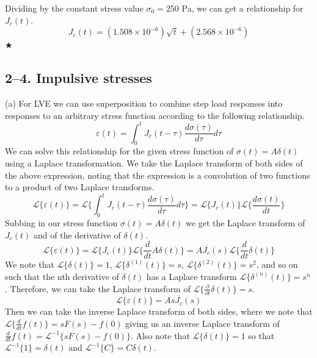 \documentclass[preprint,12pt,authoryear]{elsarticle}
\begin{document}
Dividing by the constant stress value $\sigma_0 = 250$ Pa, we can get a relationship for $J_c(t)$.
\begin{equation}
    J_c(t) =(1.508 \times10^{-6})\sqrt{t}+(2.568 \times 10^{-6})
\end{equation}
\hspace*{\fill} $\bigstar$

\bigskip
\subsection*{2--4. \textbf{Impulsive stresses}}
\medskip
(a) For LVE we can use superposition to combine step load responses into responses to an arbitrary stress function according to the following relationship.
\begin{equation}
    \varepsilon(t) = \int_{0}^{t}J_c(t-\tau)\frac{d\sigma(\tau)}{d\tau}d\tau
\end{equation}
We can solve this relationship for the given stress function of $\sigma(t) = A \delta(t)$ using a Laplace transformation. We take the Laplace transform of both sides of the above expression, noting that the expression is a convolution of two functions to a product of two Laplace transforms.
\begin{equation}
    \mathcal{L}\{ \varepsilon(t)\} = \mathcal{L}\{ \int_{0}^{t}J_c(t-\tau)\frac{d\sigma(\tau)}{d\tau}d\tau\} = \mathcal{L}\{ J_c(t)\}\mathcal{L}\{ \frac{d \sigma(t)}{d t}\}
\end{equation}
Subbing in our stress function $\sigma(t) = A \delta(t)$ we get the Laplace transform of $J_c(t)$ and of the derivative of $\delta(t)$.
\begin{equation}
    \mathcal{L}\{ \varepsilon(t)\} = \mathcal{L}\{ J_c(t)\}\mathcal{L}\{ \frac{d}{d t} A \delta(t)\} = A \overline{J_c}(s)\mathcal{L}\{ \frac{d}{d t}\delta(t)\}
\end{equation}
We note that $\mathcal{L}\{ \delta(t) \} = 1$, $\mathcal{L}\{ \delta^{(1)}(t) \} = s$, $\mathcal{L}\{ \delta^{(2)}(t) \} = s^2$, and so on such that the nth derivative of $\delta(t)$ has a Laplace transform $\mathcal{L}\{ \delta^{(n)}(t) \} = s^n$. Therefore, we can take the Laplace transform of $\mathcal{L}\{ \frac{\partial}{\partial t} \delta(t) \} = s$.
\begin{equation}
    \mathcal{L}\{ \varepsilon(t)\} = A s \overline{J_c}(s)
\end{equation}
Then we can take the inverse Laplace transform of both sides, where we note that $\mathcal{L} \{ \frac{d}{dt} f(t) \} = sF(s) - f(0)$ giving us an inverse Laplace transform of $ \frac{d}{dt} f(t) = \mathcal{L}^{-1} \{ sF(s) - f(0) \}$. Also note that $\mathcal{L}\{ \delta(t) \} = 1$ so that $\mathcal{L}^{-1} \{ 1 \} = \delta(t)$ and $\mathcal{L}^{-1} \{ C \} = C\delta(t)$.
\end{document}
